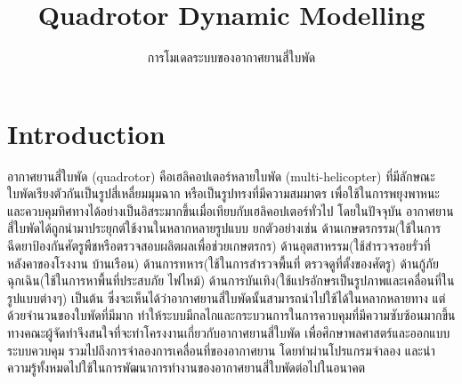 \documentclass{classes/fiboReport}
\begin{document}
\subject{FRA501 Principles of Model-based Design in Robotics}
\title{Quadrotor Dynamic Modelling}
\subtitle{การโมเดลระบบของอากาศยานสี่ใบพัด}
\pagecolor{tudelft-cyan}

\maketitle
\frontmatter

\tableofcontents
% 
% 




\mainmatter
\chapter{Introduction}
อากาศยานสี่ใบพัด (quadrotor) คือเฮลิคอปเตอร์หลายใบพัด (multi-helicopter) ที่มีลักษณะใบพัดเรียงตัวกันเป็นรูปสี่เหลื่ยมมุมฉาก
หรือเป็นรูปทรงที่มีความสมมาตร เพื่อใช้ในการพยุงพาหนะและควบคุมทิศทางได้อย่างเป็นอิสระมากขึ้นเมื่อเทียบกับเฮลิคอปเตอร์ทั่วไป
โดยในปัจจุบัน อากาศยานสี่ใบพัดได้ถูกนำมาประยุกต์ใช้งานในหลากหลายรูปแบบ ยกตัวอย่างเช่น ด้านเกษตรกรรม(ใช้ในการฉีดยาป้องกันศัตรูพืชหรือตรวจสอบผลิตผลเพื่อช่วยเกษตรกร)
ด้านอุตสาหรรม(ใช้สำรวจรอยรั่วที่หลังคาของโรงงาน บ้านเรือน) ด้านการทหาร(ใช้ในการสำรวจพื้นที่ ตรวจดูที่ตั้งของศัตรู) ด้านกู้ภัยฉุกเฉิน(ใช้ในการหาพื้นที่ประสบภัย ไฟไหม้)
ด้านการบันเทิง(ใช้แปรอักษรเป็นรูปภาพและเคลื่อนที่ในรูปแบบต่างๆ) เป็นต้น ซึ่งจะเห็นได้ว่าอากาศยานสี่ใบพัดนั้นสามารถนำไปใช้ได้ในหลากหลายทาง
แต่ด้วยจำนวนของใบพัดที่มีมาก ทำให้ระบบมีกลไกและกระบวนการในการควบคุมที่มีความซับซ้อนมากขึ้น
ทางคณะผู้จัดทำจึงสนใจที่จะทำโครงงานเกี่ยวกับอากาศยานสี่ใบพัด เพื่อศึกษาพลศาสตร์และออกแบบระบบควบคุม รวมไปถึงการจำลองการเคลื่อนที่ของอากาศยาน
โดยทำผ่านโปรแกรมจำลอง และนำความรู้ทั้งหมดไปใช้ในการพัฒนาการทำงานของอากาศยานสี่ใบพัดต่อไปในอนาคต
\end{document}
